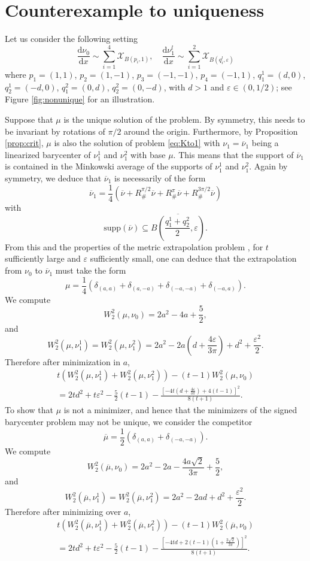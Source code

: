\documentclass[12pt]{amsart}
\numberwithin{equation}{section}
\let\mc=\mathcal
\let\mr=\mathrm
\def\ed{\mathrm{d}}
\theoremstyle{plain}
\theoremstyle{definition}
\begin{document}
\section{Counterexample to uniqueness}\label{app:counter}


Let us consider the following setting
\[
\frac{\ed\nu_0}{\ed x} \sim \sum_{i=1}^4 \mc{X}_{B(p_i,1)}, \quad
\frac{\ed\nu_1^l}{\ed x} \sim \sum_{i=1}^2 \mc{X}_{B(q_i^l,\varepsilon)}
\]
where $p_1 =(1,1)$, $p_2=(1,-1)$, $p_3 = (-1,-1)$, $p_4=(-1,1)$, 
$q_1^1 = (d,0)$, $q_2^1=(-d,0)$, $q_1^2 = (0,d)$, $q_2^2 =(0,-d)$, 
with $d>1$ and $\varepsilon\in(0,1/2)$; see Figure \ref{fig:nonunique} for an illustration.

Suppose that $\mu$ is the unique solution of the problem. By symmetry, this needs 
to be invariant by rotations of $\pi/2$ around the origin. Furthermore, by 
Proposition \ref{prop:crit}, $\mu$ is also the solution of problem 
\eqref{eq:Kto1} with $\nu_1=\overline{\nu}_1$ being a linearized barycenter of 
$\nu_1^1$ and $\nu_1^2$ with base $\mu$. This means that the support of 
$\overline{\nu}_1$ is contained in the Minkowski average of the supports of 
$\nu_1^1$ and $\nu_1^2$. Again by symmetry, we deduce that 
$\overline{\nu}_1$ is necessarily of the form
\[
\overline{\nu}_1 = \frac{1}{4} \left( \overline{\nu} 
+ R^{\pi/2}_\# \overline{\nu}
+ R^{\pi}_\# \overline{\nu}
+ R^{3\pi/2}_\# \overline{\nu} \right)
\]
with
\[
\mr{supp}(\overline{\nu}) \subseteq 
\overline{B\left( \frac{q_1^1+q_2^2}{2},\varepsilon\right)}.
\]
From this and the properties of the metric extrapolation problem 
\cite{gallouet2025metric}, for $t$ sufficiently large and $\varepsilon$ sufficiently small, one can deduce that the 
extrapolation from $\nu_0$ to $\overline{\nu}_1$ must take the form
\[
\mu = \frac{1}{4}(\delta_{(a,a)} + \delta_{(a,-a)}
+\delta_{(-a,-a)}+\delta_{(-a,a)}) .
\]
We compute
\[
W_2^2(\mu,\nu_0)=2a^2-4a+\frac52,
\]
and
\[
W_2^2(\mu,\nu_1^1)
=
W_2^2(\mu,\nu_1^2)
=
2a^2
-2a\left(d+\frac{4\varepsilon}{3\pi}\right)
+d^2+\frac{\varepsilon^2}{2}.
\]
Therefore after minimization in $a$,
\begin{multline*}
t(W_2^2(\mu,\nu_1^1)+W_2^2(\mu,\nu_1^2))
-(t-1)W_2^2(\mu,\nu_0)
\\
=
2td^2+t\varepsilon^2-\frac52(t-1)
-\frac{
\left[
-4t\left(d+\frac{4\varepsilon}{3\pi}\right)
+4(t-1)
\right]^2
}{8(t+1)} .
\end{multline*}
To show that $\mu$ is not a minimizer, and hence that the minimizers of the 
signed barycenter problem may not be unique, we consider the competitor
\[
\overline{\mu}=\frac12(\delta_{(a,a)}+\delta_{(-a,-a)}).
\]
We compute
\[
W_2^2(\overline{\mu},\nu_0)
=
2a^2-2a-\frac{4a\sqrt2}{3\pi}+\frac52,
\]
and
\[
W_2^2(\overline{\mu},\nu_1^1)
=
W_2^2(\overline{\mu},\nu_1^2)
=
2a^2-2ad+d^2+\frac{\varepsilon^2}{2}.
\]
Therefore after minimizing over $a$,
\begin{multline*}
t(W_2^2(\overline{\mu},\nu_1^1)
+W_2^2(\overline{\mu},\nu_1^2))
-(t-1)W_2^2(\overline{\mu},\nu_0)
\\
=
2td^2+t\varepsilon^2-\frac52(t-1)
-\frac{
\left[
-4td+
2(t-1)\left(1+\frac{2\sqrt2}{3\pi}\right)
\right]^2
}{8(t+1)} .
\end{multline*}
\end{document}
